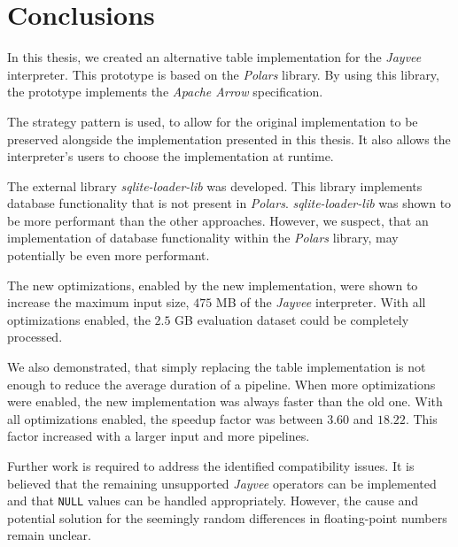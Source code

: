 \chapter{Conclusions}
\label{chapter:Conclusions}

In this thesis, we created an alternative table implementation for the \emph{Jayvee} interpreter.
This prototype is based on the \emph{Polars} library.
By using this library, the prototype implements the \emph{Apache Arrow} specification.

The strategy pattern is used, to allow for the original implementation to be preserved alongside the implementation presented in this thesis.
It also allows the interpreter's users to choose the implementation at runtime.


The external library \emph{sqlite-loader-lib} was developed.
This library implements database functionality that is not present in \emph{Polars}.
\emph{sqlite-loader-lib} was shown to be more performant than the other approaches.
However, we suspect, that an implementation of database functionality within the \emph{Polars} library, may potentially be even more performant.

The new optimizations, enabled by the new implementation, were shown to increase the maximum input size, $475$ \ac{MB} of the \emph{Jayvee} interpreter.
With all optimizations enabled, the $2.5$ \ac{GB} evaluation dataset could be completely processed.

We also demonstrated, that simply replacing the table implementation is not enough to reduce the average duration of a pipeline.
When more optimizations were enabled, the new implementation was always faster than the old one.
With all optimizations enabled, the speedup factor was between $3.60$ and $18.22$.
This factor increased with a larger input and more pipelines.


Further work is required to address the identified compatibility issues.
It is believed that the remaining unsupported \emph{Jayvee} operators can be implemented and that \Verb|NULL| values can be handled appropriately.
However, the cause and potential solution for the seemingly random differences in floating-point numbers remain unclear.

